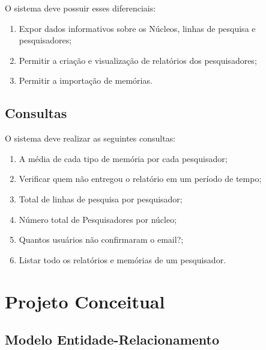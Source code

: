 \documentclass[11pt]{../../classes/ifscarticle}
\begin{document}
O sistema deve possuir esses diferenciais:

\begin{enumerate}
    \item Expor dados informativos sobre os Núcleos, linhas de pesquisa e pesquisadores;
    \item Permitir a criação e visualização de relatórios dos pesquisadores;
    \item Permitir a importação de memórias.
\end{enumerate}

\subsection{Consultas}


O sistema deve realizar as seguintes consultas:
\begin{enumerate}
    \item A média de cada tipo de memória por cada pesquisador;
    \item Verificar quem não entregou o relatório em um período de tempo;
    \item Total de linhas de pesquisa por pesquisador;
    \item Número total de Pesquisadores por núcleo;
    \item Quantos usuários não confirmaram o email?;
    \item Listar todo os relatórios e memórias de um pesquisador.
\end{enumerate}


\clearpage
\section{Projeto Conceitual}
\subsection{Modelo Entidade-Relacionamento}
\end{document}
